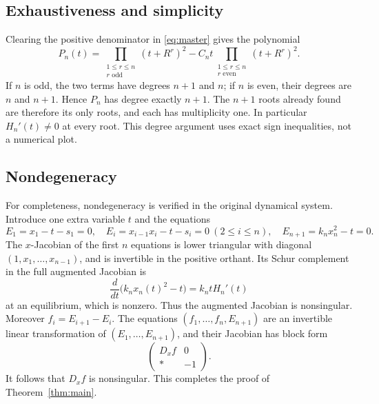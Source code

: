 \documentclass[11pt]{article}
\begin{document}
\subsection{Exhaustiveness and simplicity}
Clearing the positive denominator in \eqref{eq:master} gives the polynomial
\begin{equation}\label{eq:poly-general}
P_n(t)=\prod_{\substack{1\leq r\leq n\\r\text{ odd}}}(t+R^r)^2
-C_nt\prod_{\substack{1\leq r\leq n\\r\text{ even}}}(t+R^r)^2.
\end{equation}
If $n$ is odd, the two terms have degrees $n+1$ and $n$; if $n$ is even, their degrees are $n$ and $n+1$. Hence $P_n$ has degree exactly $n+1$. The $n+1$ roots already found are therefore its only roots, and each has multiplicity one. In particular $H_n'(t)\ne0$ at every root. This degree argument uses exact sign inequalities, not a numerical plot.

\subsection{Nondegeneracy}
For completeness, nondegeneracy is verified in the original dynamical system. Introduce one extra variable $t$ and the equations
\[
E_1=x_1-t-s_1=0,\quad
E_i=x_{i-1}x_i-t-s_i=0\ (2\leq i\leq n),\quad
E_{n+1}=k_nx_n^2-t=0.
\]
The $x$-Jacobian of the first $n$ equations is lower triangular with diagonal $(1,x_1,\ldots,x_{n-1})$, and is invertible in the positive orthant. Its Schur complement in the full augmented Jacobian is
\[
\frac{d}{dt}\bigl(k_nx_n(t)^2-t\bigr)
=k_n tH_n'(t)
\]
at an equilibrium, which is nonzero. Thus the augmented Jacobian is nonsingular. Moreover $f_i=E_{i+1}-E_i$. The equations $(f_1,\ldots,f_n,E_{n+1})$ are an invertible linear transformation of $(E_1,\ldots,E_{n+1})$, and their Jacobian has block form
\[
\begin{pmatrix}D_x f&0\\ *&-1\end{pmatrix}.
\]
It follows that $D_xf$ is nonsingular. This completes the proof of Theorem~\ref{thm:main}.
\end{document}
